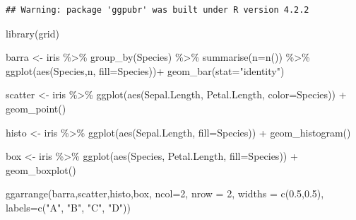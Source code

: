 \documentclass[
]{book}
\newenvironment{Shaded}{\begin{snugshade}}{\end{snugshade}}
\newcommand{\AttributeTok}[1]{\textcolor[rgb]{0.77,0.63,0.00}{#1}}
\newcommand{\DecValTok}[1]{\textcolor[rgb]{0.00,0.00,0.81}{#1}}
\newcommand{\FloatTok}[1]{\textcolor[rgb]{0.00,0.00,0.81}{#1}}
\newcommand{\FunctionTok}[1]{\textcolor[rgb]{0.00,0.00,0.00}{#1}}
\newcommand{\NormalTok}[1]{#1}
\newcommand{\OtherTok}[1]{\textcolor[rgb]{0.56,0.35,0.01}{#1}}
\newcommand{\SpecialCharTok}[1]{\textcolor[rgb]{0.00,0.00,0.00}{#1}}
\newcommand{\StringTok}[1]{\textcolor[rgb]{0.31,0.60,0.02}{#1}}
\begin{document}
\begin{verbatim}
## Warning: package 'ggpubr' was built under R version 4.2.2
\end{verbatim}

\begin{Shaded}
\begin{Highlighting}[]
\FunctionTok{library}\NormalTok{(grid)}


\NormalTok{barra }\OtherTok{\textless{}{-}}\NormalTok{ iris }\SpecialCharTok{\%\textgreater{}\%} 
  \FunctionTok{group\_by}\NormalTok{(Species) }\SpecialCharTok{\%\textgreater{}\%} 
  \FunctionTok{summarise}\NormalTok{(}\AttributeTok{n=}\FunctionTok{n}\NormalTok{()) }\SpecialCharTok{\%\textgreater{}\%} 
  \FunctionTok{ggplot}\NormalTok{(}\FunctionTok{aes}\NormalTok{(Species,n, }\AttributeTok{fill=}\NormalTok{Species))}\SpecialCharTok{+}
  \FunctionTok{geom\_bar}\NormalTok{(}\AttributeTok{stat=}\StringTok{"identity"}\NormalTok{)}

\NormalTok{scatter }\OtherTok{\textless{}{-}}\NormalTok{ iris }\SpecialCharTok{\%\textgreater{}\%} 
  \FunctionTok{ggplot}\NormalTok{(}\FunctionTok{aes}\NormalTok{(Sepal.Length, Petal.Length, }\AttributeTok{color=}\NormalTok{Species)) }\SpecialCharTok{+}
  \FunctionTok{geom\_point}\NormalTok{()}

\NormalTok{histo }\OtherTok{\textless{}{-}}\NormalTok{ iris }\SpecialCharTok{\%\textgreater{}\%} 
  \FunctionTok{ggplot}\NormalTok{(}\FunctionTok{aes}\NormalTok{(Sepal.Length, }\AttributeTok{fill=}\NormalTok{Species)) }\SpecialCharTok{+}
  \FunctionTok{geom\_histogram}\NormalTok{()}

\NormalTok{box }\OtherTok{\textless{}{-}}\NormalTok{ iris }\SpecialCharTok{\%\textgreater{}\%} 
  \FunctionTok{ggplot}\NormalTok{(}\FunctionTok{aes}\NormalTok{(Species, Petal.Length, }\AttributeTok{fill=}\NormalTok{Species)) }\SpecialCharTok{+}
  \FunctionTok{geom\_boxplot}\NormalTok{()}
\end{Highlighting}
\end{Shaded}

\begin{Shaded}
\begin{Highlighting}[]
\FunctionTok{ggarrange}\NormalTok{(barra,scatter,histo,box, }\AttributeTok{ncol=}\DecValTok{2}\NormalTok{, }\AttributeTok{nrow =} \DecValTok{2}\NormalTok{, }\AttributeTok{widths =} \FunctionTok{c}\NormalTok{(}\FloatTok{0.5}\NormalTok{,}\FloatTok{0.5}\NormalTok{), }\AttributeTok{labels=}\FunctionTok{c}\NormalTok{(}\StringTok{"A"}\NormalTok{, }\StringTok{"B"}\NormalTok{, }\StringTok{"C"}\NormalTok{, }\StringTok{"D"}\NormalTok{))}
\end{Highlighting}
\end{Shaded}
\end{document}
